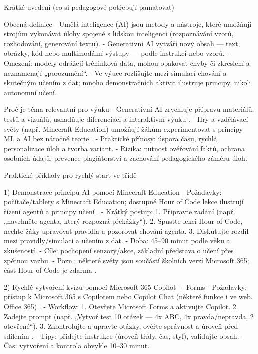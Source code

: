 Krátké uvedení (co si pedagogové potřebují pamatovat)

Obecná definice
- Umělá inteligence (AI) jsou metody a nástroje, které umožňují strojům vykonávat úlohy spojené s lidskou inteligencí (rozpoznávání vzorů, rozhodování, generování textu).
- Generativní AI vytváří nový obsah — text, obrázky, kód nebo multimodální výstupy — podle instrukcí nebo vzorů.
- Omezení: modely odrážejí tréninková data, mohou opakovat chyby či zkreslení a neznamenají „porozumění“.
- Ve výuce rozlišujte mezi simulací chování a skutečným učením z dat; mnoho demonstračních aktivit ilustruje principy, nikoli autonomní učení.

Proč je téma relevantní pro výuku
- Generativní AI zrychluje přípravu materiálů, testů a vizuálů, usnadňuje diferenciaci a interaktivní výuku \cite{kb_ai_101_tipu_pdf_04e4a115_page_36_1}.
- Hry a vzdělávací světy (např. Minecraft Education) umožňují žákům experimentovat s principy ML a AI bez náročné teorie \cite{kb_ai_101_tipu_pdf_04e4a115_page_15_2}.
- Praktické přínosy: úspora času, rychlá personalizace úloh a tvorba variant.
- Rizika: nutnost ověřování faktů, ochrana osobních údajů, prevence plagiátorství a zachování pedagogického záměru úloh.

Praktické příklady pro rychlý start ve třídě

1) Demonstrace principů AI pomocí Minecraft Education
- Požadavky: počítače/tablety s Minecraft Education; dostupné Hour of Code lekce ilustrují řízení agentů a principy učení \cite{kb_ai_101_tipu_pdf_04e4a115_page_15_2}.
- Krátký postup:
  1. Připravte zadání (např. „navrhněte agenta, který rozpozná překážky“).
  2. Spusťte lekci Hour of Code, nechte žáky upravovat pravidla a pozorovat chování agenta.
  3. Diskutujte rozdíl mezi pravidly/simulací a učením z dat.
- Doba: 45–90 minut podle věku a zkušeností.
- Cíle: pochopení senzory/akce, základní představa o učení přes zpětnou vazbu.
- Pozn.: některé světy jsou součástí školních verzí Microsoft 365; část Hour of Code je zdarma \cite{kb_ai_101_tipu_pdf_04e4a115_page_15_2}.

2) Rychlé vytvoření kvízu pomocí Microsoft 365 Copilot + Forms
- Požadavky: přístup k Microsoft 365 s Copilotem nebo Copilot Chat (některé funkce i ve web. Office 365) \cite{kb_ai_101_tipu_pdf_04e4a115_page_3_1}.
- Workflow:
  1. Otevřete Microsoft Forms a aktivujte Copilot.
  2. Zadejte prompt (např. „Vytvoř test 10 otázek — 4x ABC, 4x pravda/nepravda, 2 otevřené“).
  3. Zkontrolujte a upravte otázky, ověřte správnost a úroveň před sdílením \cite{kb_ai_101_tipu_pdf_04e4a115_page_36_1}.
- Tipy: přidejte instrukce (úroveň třídy, čas, styl), validujte obsah.
- Čas: vytvoření a kontrola obvykle 10–30 minut.

